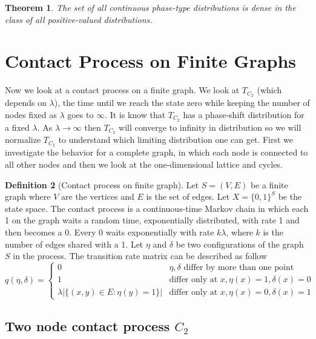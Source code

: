 \documentclass{article}
\theoremstyle{plain}
\newtheorem{theorem}{Theorem}[section]
\theoremstyle{definition}
\newtheorem{defn}[theorem]{Definition}
\theoremstyle{remark}
\numberwithin{equation}{section}
\begin{document}
\begin{theorem} \cite{neuts1981}
The set of all continuous phase-type distributions is dense in the class of all positive-valued distributions.
\end{theorem}


\section{Contact Process on Finite Graphs}

Now we look at a contact process on a finite graph.
We look at $T_{C_2}$ (which depends on $\lambda$), the time until we reach the state zero while keeping the number of nodes fixed as $\lambda$ goes to $\infty$.
It is know that $T_{C_2}$ has a phase-shift distribution for a fixed $\lambda$.
As $\lambda \to \infty$ then $T_{C_2}$ will converge to infinity in distribution so we will normalize $T_{C_2}$ to understand which limiting distribution one can get.
First we investigate the behavior for a complete graph, in which each node is connected to all other nodes and then we look at the one-dimensional lattice and cycles.

\begin{defn}[Contact process on finite graph]
Let $S = (V,E)$ be a finite graph where $V$ are the vertices and $E$ is the set of edges.
Let $X =  \{0,1\}^S$ be the state space.
The contact process is a continuous-time Markov chain in which each 1 on the graph waits a random time, exponentially distributed, with rate 1 and then becomes a 0.
Every 0 waits exponentially with rate $k \lambda$, where $k$ is the number of edges shared with a 1.
Let $\eta$ and $\delta$ be two configurations of the graph $S$ in the process.
The transition rate matrix can be described as follow
$$
q(\eta, \delta) = \begin{cases}
    0 & \eta, \delta \text{ differ by more than one point}\\
    1 & \text{differ only at } x, \eta(x) = 1, \delta(x) = 0\\
    \lambda |\{ (x,y) \in E : \eta(y) = 1\}| & \text{differ only at } x, \eta(x) = 0, \delta(x) = 1
\end{cases}
$$
\end{defn}

\subsection{Two node contact process \texorpdfstring{$C_2$}{C2}}
\end{document}
